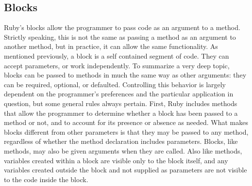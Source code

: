 \documentclass[12pt]{article}
\begin{document}
\subsection{Blocks}\label{blocks}
Ruby's blocks allow the programmer to pass code as an argument to a method. Strictly speaking, this is not the same as passing a method as an argument to another method, but in practice, it can allow the same functionality\cite{mixandgo}. As mentioned previously, a block is a self contained segment of code. They can accept parameters, or work independently.
To summarize a very deep topic, blocks can be passed to methods in much the same way as other arguments: they can be required, optional, or defaulted. Controlling this behavior is largely dependent on the programmer's preferences and the particular application in question, but some general rules always pertain. First, Ruby includes methods that allow the programmer to determine whether a block has been passed to a method or not, and to account for its presence or absence as needed. What makes blocks different from other parameters is that they may be passed to any method, regardless of whether the method declaration includes parameters. Blocks, like methods, may also be given arguments when they are called. Also like methods, variables created within a block are visible only to the block itself, and any variables created outside the block and not supplied as parameters are not visible to the code inside the block\cite{mixandgo}.



\pagebreak
\nocite{*}

{}
\end{document}
